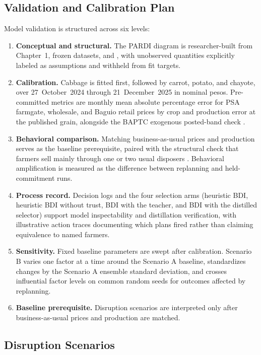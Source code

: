 \documentclass{icsthesis}
\begin{document}
\begin{mainmatter}
		\subsection{Validation and Calibration Plan}

			Model validation is structured across six levels:

			\begin{enumerate}
				\item \textbf{Conceptual and structural.} The PARDI diagram is researcher-built from Chapter~1, frozen datasets, and \citet{deGuzmanBambicoBaconguis2023}, with unobserved quantities explicitly labeled as assumptions and withheld from fit targets.
				\item \textbf{Calibration.} Cabbage is fitted first, followed by carrot, potato, and chayote, over 27~October~2024 through 21~December~2025 in nominal pesos. Pre-committed metrics are monthly mean absolute percentage error for PSA farmgate, wholesale, and Baguio retail prices by crop and production error at the published grain, alongside the BAPTC exogenous posted-band check \citep{AgriTrakPH2025}.
				\item \textbf{Behavioral comparison.} Matching business-as-usual prices and production serves as the baseline prerequisite, paired with the structural check that farmers sell mainly through one or two usual disposers \citep{deGuzmanBambicoBaconguis2023}. Behavioral amplification is measured as the difference between replanning and held-commitment runs.
				\item \textbf{Process record.} Decision logs and the four selection arms (heuristic BDI, heuristic BDI without trust, BDI with the teacher, and BDI with the distilled selector) support model inspectability and distillation verification, with illustrative action traces documenting which plans fired rather than claiming equivalence to named farmers.
				\item \textbf{Sensitivity.} Fixed baseline parameters are swept after calibration. Scenario B varies one factor at a time around the Scenario A baseline, standardizes changes by the Scenario A ensemble standard deviation, and crosses influential factor levels on common random seeds for outcomes affected by replanning.
				\item \textbf{Baseline prerequisite.} Disruption scenarios are interpreted only after business-as-usual prices and production are matched.
			\end{enumerate}

		\subsection{Disruption Scenarios}


\end{mainmatter}
\end{document}
